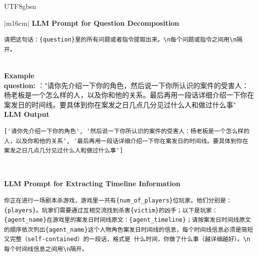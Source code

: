 \documentclass[11pt]{article}
\begin{document}
{\begin{CJK}{UTF8}{gbsn}
\begin{table}[ht!]
\centering
\begin{minipage}{\textwidth}
\begin{tabular}{|m{16cm}|}
\hline
{}  {\textbf{LLM Prompt for Question Decomposition}} \\
\begin{minipage}[t]{\linewidth}
\small\begin{verbatim}
请把这句话：{question}里的所有问题或者指令提取出来。\n每个问题或指令之间用\n隔开。
\end{verbatim}
\end{minipage} \\
\hline
{}  \textbf{Example}  \\
 \textbf{  question:} ："请你先介绍一下你的角色，然后说一下你所认识的案件的受害人：杨老板是一个怎么样的人，以及你和他的关系。最后再用一段话详细介绍一下你在案发日的时间线。要具体到你在案发之日几点几分见过什么人和做过什么事"\\

 
\hline
{}  \textbf{LLM Output}  \\
\hline
\begin{minipage}[t]{\linewidth}
\small\begin{verbatim}
['请你先介绍一下你的角色', '然后说一下你所认识的案件的受害人：杨老板是一个怎么样的人，以及你和他的关系', '最后再用一段话详细介绍一下你在案发日的时间线。要具体到你在案发之日几点几分见过什么人和做过什么事']

\end{verbatim}
\end{minipage} \\
\hline



\hline
{}  {\textbf{LLM Prompt for Extracting Timeline Information}} \\
\begin{minipage}[t]{\linewidth}
\small\begin{verbatim}
你正在进行一场剧本杀游戏，游戏里一共有{num_of_players}位玩家。他们分别是：{players}。玩家们需要通过互相交流找到杀害{victim}的凶手；以下是玩家：{agent_name}在游戏里的案发日时间线原文：{agent_timeline}；请按案发日时间线原文的顺序依次列出{agent_name}这个人物角色案发日时间线的信息，每个时间线信息必须是简短又完整（self-contained）的一段话，格式是 什么时间，你做了什么事（越详细越好）。\n每个时间线信息之间用\n隔开。


\end{verbatim}
\end{minipage}
\end{tabular}
\end{minipage}
\end{table}
\end{CJK}}
\end{document}
